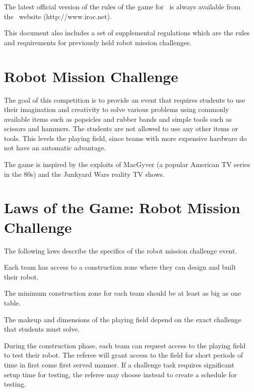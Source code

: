\documentclass[12pt]{hurocup}
\begin{document}
The latest official version of the rules of the game for \IROC\ is
always available from the \IROC\ website (http://www.iroc.net).

This document also includes a set of supplemental regulations which
are the rules and requirements for previously held robot mission
challenges.

\section{Robot Mission Challenge}
\label{sec:robot-mission-challenge} 

The goal of this competition is to provide an event that requires
students to use their imagination and creativity to solve various
problems using commonly available items such as popsicles and rubber
bands and simple tools such as scissors and hammers. The students are
not allowed to use any other items or tools. This levels the playing
field, since teams with more expensive hardware do not have an
automatic advantage.

The game is inspired by the exploits of MacGyver (a popular American TV
series in the 80s) and the Junkyard Wars reality TV shows.

\section{Laws of the Game: Robot Mission Challenge}
\label{sec:laws-robot-mission-challenge}

The following laws describe the specifics of the robot mission
challenge event.

\label{jc-team}

\begin{lawlist}[JC]

\item Each team has access to a construction zone where they can
  design and built their robot. 

\item The minimum construction zone for each team should be at least
  as big as one table.

\end{lawlist}

\label{lc-field}

\begin{lawlist}[JC]

\item The makeup and dimensions of the playing field depend on the
  exact challenge that students must solve.

\item During the construction phase, each team can request access to
  the playing field to test their robot. The referee will grant access
  to the field for short periods of time in first come first served
  manner. If a challenge task requires significant setup time for
  testing, the referee may choose instead to create a schedule for
  testing.

\end{lawlist}
\end{document}
